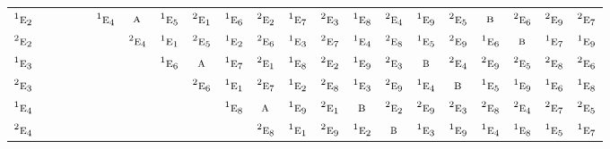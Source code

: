 \documentclass[10pt,a4paper]{article}
\numberwithin{equation}{section}
\newcommand{\irr}[1]{\text{\normalfont\scshape #1}}
\newcommand{\conjpair}[1]{{}^{#1}}
\begin{document}
{\begin{longtable}{@{}lcccccccccccccccccccc@{}}
$\conjpair{1}\irr{e}_{2}$ &  &  &  &  & $\conjpair{1}\irr{e}_{4}$ & $\irr{a}$ & $\conjpair{1}\irr{e}_{5}$ & $\conjpair{2}\irr{e}_{1}$ & $\conjpair{1}\irr{e}_{6}$ & $\conjpair{2}\irr{e}_{2}$ & $\conjpair{1}\irr{e}_{7}$ & $\conjpair{2}\irr{e}_{3}$ & $\conjpair{1}\irr{e}_{8}$ & $\conjpair{2}\irr{e}_{4}$ & $\conjpair{1}\irr{e}_{9}$ & $\conjpair{2}\irr{e}_{5}$ & $\irr{b}$ & $\conjpair{2}\irr{e}_{6}$ & $\conjpair{2}\irr{e}_{9}$ & $\conjpair{2}\irr{e}_{7}$\\
$\conjpair{2}\irr{e}_{2}$ &  &  &  &  &  & $\conjpair{2}\irr{e}_{4}$ & $\conjpair{1}\irr{e}_{1}$ & $\conjpair{2}\irr{e}_{5}$ & $\conjpair{1}\irr{e}_{2}$ & $\conjpair{2}\irr{e}_{6}$ & $\conjpair{1}\irr{e}_{3}$ & $\conjpair{2}\irr{e}_{7}$ & $\conjpair{1}\irr{e}_{4}$ & $\conjpair{2}\irr{e}_{8}$ & $\conjpair{1}\irr{e}_{5}$ & $\conjpair{2}\irr{e}_{9}$ & $\conjpair{1}\irr{e}_{6}$ & $\irr{b}$ & $\conjpair{1}\irr{e}_{7}$ & $\conjpair{1}\irr{e}_{9}$\\
$\conjpair{1}\irr{e}_{3}$ &  &  &  &  &  &  & $\conjpair{1}\irr{e}_{6}$ & $\irr{a}$ & $\conjpair{1}\irr{e}_{7}$ & $\conjpair{2}\irr{e}_{1}$ & $\conjpair{1}\irr{e}_{8}$ & $\conjpair{2}\irr{e}_{2}$ & $\conjpair{1}\irr{e}_{9}$ & $\conjpair{2}\irr{e}_{3}$ & $\irr{b}$ & $\conjpair{2}\irr{e}_{4}$ & $\conjpair{2}\irr{e}_{9}$ & $\conjpair{2}\irr{e}_{5}$ & $\conjpair{2}\irr{e}_{8}$ & $\conjpair{2}\irr{e}_{6}$\\
$\conjpair{2}\irr{e}_{3}$ &  &  &  &  &  &  &  & $\conjpair{2}\irr{e}_{6}$ & $\conjpair{1}\irr{e}_{1}$ & $\conjpair{2}\irr{e}_{7}$ & $\conjpair{1}\irr{e}_{2}$ & $\conjpair{2}\irr{e}_{8}$ & $\conjpair{1}\irr{e}_{3}$ & $\conjpair{2}\irr{e}_{9}$ & $\conjpair{1}\irr{e}_{4}$ & $\irr{b}$ & $\conjpair{1}\irr{e}_{5}$ & $\conjpair{1}\irr{e}_{9}$ & $\conjpair{1}\irr{e}_{6}$ & $\conjpair{1}\irr{e}_{8}$\\
$\conjpair{1}\irr{e}_{4}$ &  &  &  &  &  &  &  &  & $\conjpair{1}\irr{e}_{8}$ & $\irr{a}$ & $\conjpair{1}\irr{e}_{9}$ & $\conjpair{2}\irr{e}_{1}$ & $\irr{b}$ & $\conjpair{2}\irr{e}_{2}$ & $\conjpair{2}\irr{e}_{9}$ & $\conjpair{2}\irr{e}_{3}$ & $\conjpair{2}\irr{e}_{8}$ & $\conjpair{2}\irr{e}_{4}$ & $\conjpair{2}\irr{e}_{7}$ & $\conjpair{2}\irr{e}_{5}$\\
$\conjpair{2}\irr{e}_{4}$ &  &  &  &  &  &  &  &  &  & $\conjpair{2}\irr{e}_{8}$ & $\conjpair{1}\irr{e}_{1}$ & $\conjpair{2}\irr{e}_{9}$ & $\conjpair{1}\irr{e}_{2}$ & $\irr{b}$ & $\conjpair{1}\irr{e}_{3}$ & $\conjpair{1}\irr{e}_{9}$ & $\conjpair{1}\irr{e}_{4}$ & $\conjpair{1}\irr{e}_{8}$ & $\conjpair{1}\irr{e}_{5}$ & $\conjpair{1}\irr{e}_{7}$\\

\end{longtable}}
\end{document}
